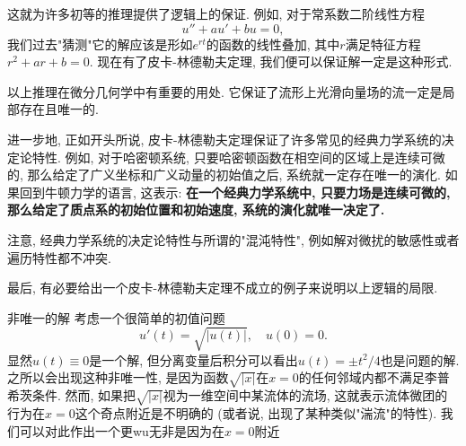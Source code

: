 这就为许多初等的推理提供了逻辑上的保证. 例如, 对于常系数二阶线性方程
$$
u''+au'+bu=0,
$$
我们过去"猜测"它的解应该是形如$e^{rt}$的函数的线性叠加, 其中$r$满足特征方程$r^2+ar+b=0$. 现在有了皮卡-林德勒夫定理, 我们便可以保证解一定是这种形式. 

以上推理在微分几何学中有重要的用处. 它保证了流形上光滑向量场的流一定是局部存在且唯一的.

进一步地, 正如开头所说, 皮卡-林德勒夫定理保证了许多常见的经典力学系统的决定论特性. 例如, 对于哈密顿系统, 只要哈密顿函数在相空间的区域上是连续可微的, 那么给定了广义坐标和广义动量的初始值之后, 系统就一定存在唯一的演化. 如果回到牛顿力学的语言, 这表示: \textbf{在一个经典力学系统中, 只要力场是连续可微的, 那么给定了质点系的初始位置和初始速度, 系统的演化就唯一决定了.}

注意, 经典力学系统的决定论特性与所谓的"混沌特性", 例如解对微扰的敏感性或者遍历特性都不冲突.

最后, 有必要给出一个皮卡-林德勒夫定理不成立的例子来说明以上逻辑的局限. 
\begin{example}{非唯一的解}
考虑一个很简单的初值问题
$$
u'(t)=\sqrt{|u(t)|},\quad u(0)=0.
$$
显然$u(t)\equiv0$是一个解, 但分离变量后积分可以看出$u(t)=\pm t^2/4$也是问题的解. 之所以会出现这种非唯一性, 是因为函数$\sqrt{|x|}$在$x=0$的任何邻域内都不满足李普希茨条件. 然而, 如果把$\sqrt{|x|}$视为一维空间中某流体的流场, 这就表示流体微团的行为在$x=0$这个奇点附近是不明确的 (或者说, 出现了某种类似"湍流"的特性). 我们可以对此作出一个更wu无非是因为在$x=0$附近
\end{example}
